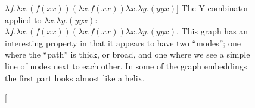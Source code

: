 \begin{figure}[htbp]
{	}
	
	\caption
	[$\lambda f.\lambda x.(f (x x)) (\lambda x.f (x x)) \lambda x.\lambda y.(y y x)$]
	{The Y-combinator applied to $\lambda x.\lambda y.(y y x)$: $\lambda f.\lambda x.(f (x x)) (\lambda x.f (x x)) \lambda x.\lambda y.(y y x)$.
	This graph has an interesting property in that it appears to have two ``modes'';
	one where the ``path'' is thick, or broad, and one where we see a simple line
	of nodes next to each other. In some of the graph embeddings the first part
	looks almost like a helix.}
	\label{fig:images_Ycomb_3_1}
\end{figure}

